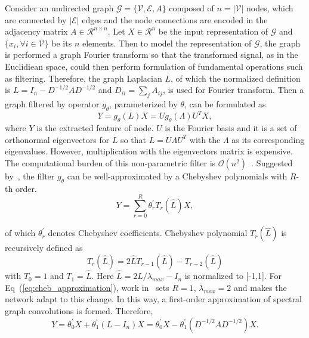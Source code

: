 \documentclass[letterpaper]{article} \usepackage{aaai19}  \usepackage{times}  \usepackage{helvet} \usepackage{courier}  \usepackage[hyphens]{url}  \usepackage{graphicx} \urlstyle{rm} \def\UrlFont{\rm}  \usepackage{graphicx}  \frenchspacing  \setlength{\pdfpagewidth}{8.5in}  \setlength{\pdfpageheight}{11in}
\begin{document}
Consider an undirected graph $\mathcal{G} = \{\mathcal{V}, \mathcal{E}, A\}$ composed of $n=|\mathcal{V}|$ nodes, which are connected by $|\mathcal{E}|$ edges and the node connections are encoded in the adjacency matrix $A \in \mathcal{R}^{n \times n}$. Let $X \in \mathcal{R}^{n}$ be the input representation of $\mathcal{G}$ and$\{ x_i, \forall i \in \mathcal{V}\}$ be its $n$ elements. Then to model the representation of $\mathcal{G}$, the graph is performed a graph Fourier transform so that the transformed signal, as in the Euclidiean space, could then perform formulation of fundamental operations such as filtering. Therefore, the graph Laplacian $L$, of which the normalized definition is $L = I_n - D^{-1/2}AD^{-1/2}$ and $D_{ii} = \sum_{j}A_{ij}$, is used for Fourier transform. Then a graph filtered by operator $g_{\theta}$, parameterized by $\theta$, can be formulated as
\begin{equation}
    Y = g_{\theta}(L)X = U g_{\theta}(\Lambda) U^{T}X,
\end{equation}
where $Y$ is the extracted feature of node. $U$ is the Fourier basis and it is a set of orthonormal eigenvectors for $L$ so that $L = U \Lambda U^T$ with the $\Lambda$ as its corresponding eigenvalues. However, multiplication with the eigenvectors matrix is expensive. The computational burden of this non-parametric filter is $\mathcal{O}(n^2)$~\cite{defferrard2016convolutional}. Suggested by~\cite{hammond2011wavelets}, the filter $g_{\theta}$ can be well-approximated by a Chebyshev polynomials with $R$-th order.
\begin{equation}\label{eq:cheb_approximation}
    Y = \sum_{r=0}^{R}\theta_r^{'}T_r(\hat{L})X,
\end{equation}

\noindent of which $\theta_r^{'}$ denotes Chebyshev coefficients. Chebyshev polynomial $T_r(\hat{L})$ is recursively defined as
\begin{equation}\label{eq:cheb}
    T_r(\hat{L}) = 2\hat{L}T_{r-1}(\hat{L})-T_{r-2}(\hat{L})
\end{equation}
 with $T_0 = 1$ and $T_1 = \hat{L}$. Here $\hat{L} = 2L/{\lambda_{max}}-I_n$ is normalized to [-1,1]. For Eq~(\ref{eq:cheb_approximation}), work in~\cite{kipf2016semi} sets $R=1$, $ \lambda_{max}= 2$ and makes the network adapt to this change. In this way, a first-order approximation of spectral graph convolutions is formed. Therefore, 
\begin{equation}
    Y = \theta_0^{'}X +\theta_1^{'}(L-I_n)X = \theta_0^{'}X -\theta_1^{'}(D^{-1/2}AD^{-1/2})X.
\end{equation}
\end{document}
